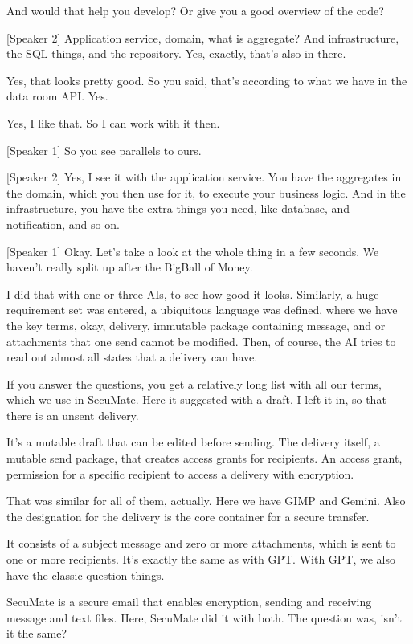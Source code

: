 And would that help you develop? Or give you a good overview of the code?

[Speaker 2]
Application service, domain, what is aggregate? And infrastructure, the SQL things, and the repository. Yes, exactly, that's also in there.

Yes, that looks pretty good. So you said, that's according to what we have in the data room API. Yes.

Yes, I like that. So I can work with it then.

[Speaker 1]
So you see parallels to ours.

[Speaker 2]
Yes, I see it with the application service. You have the aggregates in the domain, which you then use for it, to execute your business logic. And in the infrastructure, you have the extra things you need, like database, and notification, and so on.

[Speaker 1]
Okay. Let's take a look at the whole thing in a few seconds. We haven't really split up after the BigBall of Money.

I did that with one or three AIs, to see how good it looks. Similarly, a huge requirement set was entered, a ubiquitous language was defined, where we have the key terms, okay, delivery, immutable package containing message, and or attachments that one send cannot be modified. Then, of course, the AI tries to read out almost all states that a delivery can have.

If you answer the questions, you get a relatively long list with all our terms, which we use in SecuMate. Here it suggested with a draft. I left it in, so that there is an unsent delivery.

It's a mutable draft that can be edited before sending. The delivery itself, a mutable send package, that creates access grants for recipients. An access grant, permission for a specific recipient to access a delivery with encryption.

That was similar for all of them, actually. Here we have GIMP and Gemini. Also the designation for the delivery is the core container for a secure transfer.

It consists of a subject message and zero or more attachments, which is sent to one or more recipients. It's exactly the same as with GPT. With GPT, we also have the classic question things.

SecuMate is a secure email that enables encryption, sending and receiving message and text files. Here, SecuMate did it with both. The question was, isn't it the same?

